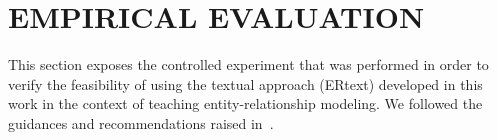 \documentclass[a4paper,twoside,anonymous]{article}
\begin{document}



\section{\uppercase{Empirical Evaluation}} 
\label{sec:evaluation}

%     

This section exposes the controlled experiment that was performed in order to verify the feasibility of using the textual approach (ERtext) developed in this work in the context of teaching entity-relationship modeling.
We followed the guidances and recommendations raised in~\cite{Wohlin:2012}.
\end{document}
